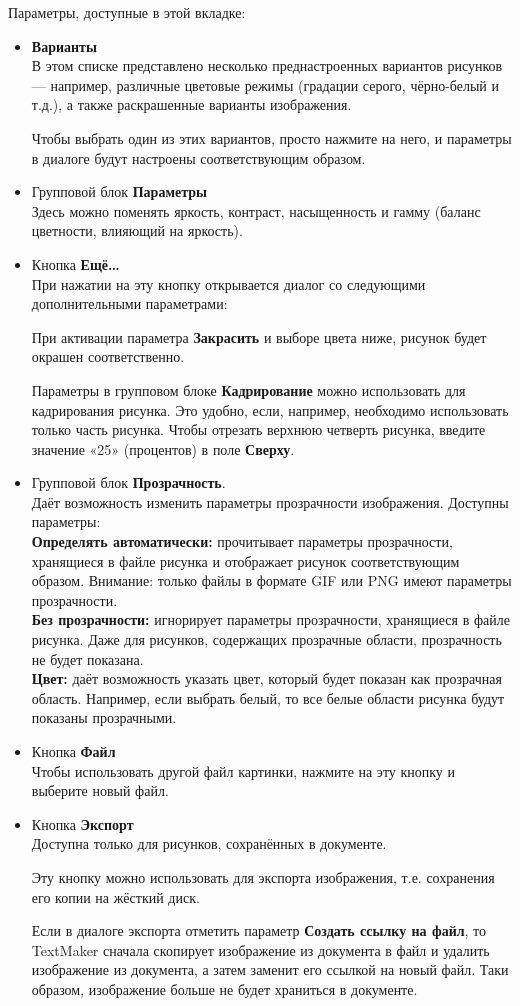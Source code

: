 \documentclass[a4paper,10pt]{article}
\begin{document}
Параметры, доступные в этой вкладке:
\begin{itemize}
 \item \textbf{Варианты}\\
 В этом списке представлено несколько преднастроенных вариантов рисунков --- например, различные цветовые режимы (градации серого, чёрно-белый и т.д.), а также раскрашенные варианты изображения.
 
 Чтобы выбрать один из этих вариантов, просто нажмите на него, и параметры в диалоге будут настроены соответствующим образом.
 \item Групповой блок \textbf{Параметры}\\
 Здесь можно поменять яркость, контраст, насыщенность и гамму (баланс цветности, влияющий на яркость).
 \item Кнопка \textbf{Ещё…}\\
 При нажатии на эту кнопку открывается диалог со следующими дополнительными параметрами:
 
 При активации параметра \textbf{Закрасить} и выборе цвета ниже, рисунок  будет окрашен соответственно.
 
 Параметры в групповом блоке \textbf{Кадрирование} можно использовать для кадрирования рисунка. Это удобно, если, например, необходимо использовать только часть рисунка. Чтобы отрезать верхнюю четверть рисунка, введите значение «25» (процентов) в поле \textbf{Сверху}.
 \item Групповой блок \textbf{Прозрачность}.\\
 Даёт возможность изменить параметры прозрачности изображения. Доступны параметры:\\
 \textbf{Определять автоматически:} прочитывает параметры прозрачности, хранящиеся в файле рисунка и отображает рисунок соответствующим образом. Внимание: только файлы в формате GIF или PNG имеют параметры прозрачности.\\
 \textbf{Без прозрачности:} игнорирует параметры прозрачности, хранящиеся в файле рисунка. Даже для рисунков, содержащих прозрачные области, прозрачность не будет показана.\\
 \textbf{Цвет:} даёт возможность указать цвет, который будет показан как прозрачная область. Например, если выбрать белый, то все белые области рисунка будут показаны прозрачными.
 \item Кнопка \textbf{Файл}\\
 Чтобы использовать другой файл картинки, нажмите на эту кнопку и выберите новый файл.\\
 \item Кнопка \textbf{Экспорт}\\
 Доступна только для рисунков, сохранённых в документе.
 
 Эту кнопку можно использовать для экспорта изображения, т.е. сохранения его копии на жёсткий диск.
 
 Если в диалоге экспорта отметить параметр \textbf{Создать ссылку на файл}, то TextMaker сначала скопирует изображение из документа в файл и удалить изображение из документа, а затем заменит его ссылкой на новый файл. Таки образом, изображение больше не будет храниться в документе.
\end{itemize}
\end{document}
